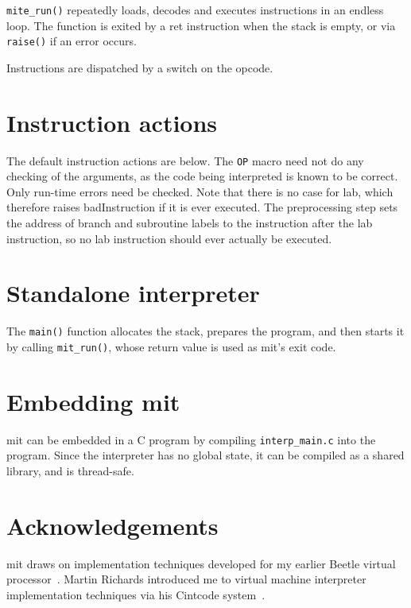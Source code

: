 \documentclass[english]{scrartcl}
\newcommand{\absfont}{\sffamily}
\newcommand{\abs}[1]{{\absfont #1}}
\begin{document}
\verb|mite_run()| repeatedly loads, decodes and executes instructions in
an endless loop. The function is exited by a \abs{ret} instruction when the
stack is empty, or via \verb|raise()| if an error occurs.

Instructions are dispatched by a switch on the opcode.


\section{Instruction actions} \label{actions}

The default instruction actions are below. The \verb|OP| macro need
not do any checking of the arguments, as the code being interpreted is
known to be correct. Only run-time errors need be checked. Note that
there is no case for \abs{lab}, which therefore raises
\abs{badInstruction} if it is ever executed. The preprocessing step
sets the address of branch and subroutine labels to the instruction
after the \abs{lab} instruction, so no \abs{lab} instruction should
ever actually be executed.



\section{Standalone interpreter}

The \verb|main()| function allocates the stack, prepares the program, and then
starts it by calling \verb|mit_run()|, whose return value is used as mit's
exit code.



\section{Embedding mit}

mit can be embedded in a C program by compiling \verb|interp_main.c| into the
program. Since the interpreter has no global state, it can be compiled as a
shared library, and is thread-safe.



\section{Acknowledgements}

mit draws on implementation techniques developed for my earlier Beetle
virtual processor~\cite{beetledis}. Martin Richards introduced me to virtual
machine interpreter implementation techniques via his Cintcode
system~\cite{cintweb}.





\end{document}
